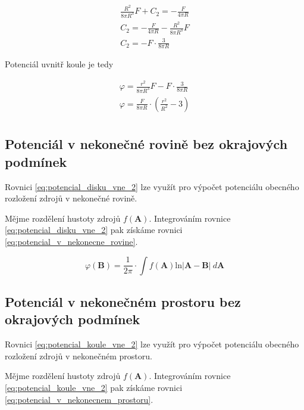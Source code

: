 \documentclass{book}
\newcommand{\vect}[1]{\boldsymbol{#1}}
\begin{document}
\begin{equation}
\begin{split}
\frac{R^2}{8 \pi R^3} F + C_2 = -\frac{F}{4 \pi R} \\
C_2 = -\frac{F}{4 \pi R} - \frac{R^2}{8 \pi R^3} F \\
C_2 = -F \cdot \frac{3}{8 \pi R}
\end{split}
\end{equation}

Potenciál uvnitř koule je tedy

\begin{equation}
\begin{split}
\varphi = \frac{r^2}{8 \pi R^3} F - F \cdot \frac{3}{8 \pi R} \\
\varphi = \frac{F}{8 \pi R} \cdot \left(\frac{r^2}{R^2} - 3 \right) \\
\end{split}
\end{equation}


\subsection{Potenciál v nekonečné rovině bez okrajových podmínek}

Rovnici \eqref{eq:potencial_disku_vne_2} lze využít pro výpočet potenciálu obecného rozložení zdrojů v nekonečné rovině.

Mějme rozdělení hustoty zdrojů \(f(\vect{A})\). Integrováním rovnice \eqref{eq:potencial_disku_vne_2} pak získáme rovnici \eqref{eq:potencial_v_nekonecne_rovine}.

\begin{equation}
\label{eq:potencial_v_nekonecne_rovine}
\varphi(\vect{B}) = \frac{1}{2 \pi} \cdot \int f(\vect{A}) \mathrm{ln} |\vect{A} - \vect{B}| \ d\vect{A}
\end{equation}

\subsection{Potenciál v nekonečném prostoru bez okrajových podmínek}

Rovnici \eqref{eq:potencial_koule_vne_2} lze využít pro výpočet potenciálu obecného rozložení zdrojů v nekonečném prostoru.

Mějme rozdělení hustoty zdrojů \(f(\vect{A})\). Integrováním rovnice \eqref{eq:potencial_koule_vne_2} pak získáme rovnici \eqref{eq:potencial_v_nekonecnem_prostoru}.
\end{document}
